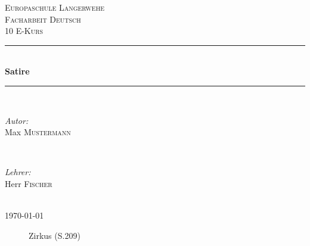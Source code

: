 \documentclass[12pt,a4paper]{scrartcl}
\begin{document}
\begin{titlepage}
\newcommand{\HRule}{\rule{\linewidth}{0.5mm}} 
\center 
\textsc{\LARGE Europaschule Langerwehe}\\[1.5cm] 
\textsc{\Large Facharbeit Deutsch}\\[0.5cm] 
\textsc{\large 10 E-Kurs}\\[0.5cm] 
\HRule \\[0.8cm]
{ \huge \bfseries Satire}\\[0.4cm] 
\HRule \\[1.5cm]
\begin{minipage}{0.4\textwidth}
\begin{flushleft} \large
\emph{Autor:}\\
Max \textsc{Mustermann} %
\end{flushleft}
\end{minipage}
~
\begin{minipage}{0.4\textwidth}
\begin{flushright} \large
\emph{Lehrer:} \\
Herr \textsc{Fischer}
\end{flushright}
\end{minipage}\\[4cm]
{\large \today}\\[3cm] 
\vfill 
\end{titlepage}
\tableofcontents 
\newpage 
%
\begin{figure}[H] %
\caption{Zirkus (S.209)}
\label{fig:speciation}
\end{figure}
\end{document}
